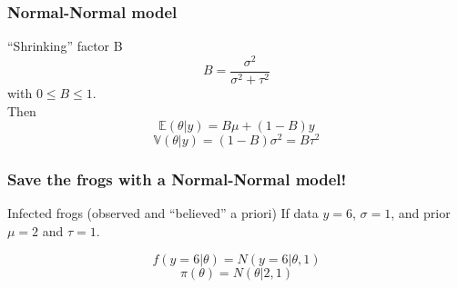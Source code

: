 \documentclass{beamer}
\newcommand{\E}{\mathbb{E}}
\newcommand{\V}{\mathbb{V}}
\newcommand{\1}{\ensuremath{\mathbf{1}}}
\begin{document}
\begin{frame}\frametitle{Normal-Normal model}
	\begin{block}{``Shrinking'' factor B}
		\begin{equation}
			B = \frac{\sigma^2}{\sigma^2 + \tau^2}
		\end{equation}
		with $0 \leq B \leq 1$.\\
		Then
		\begin{equation}
			\E(\theta|y) = B \mu + (1-B) y
		\end{equation}
		\begin{equation}
			\V(\theta|y) = (1-B)\sigma^2 = B \tau^2
		\end{equation}
	\end{block}
\end{frame}
%
%
%
\begin{frame}\frametitle{Save the frogs with a Normal-Normal model!}
	\begin{block}{Infected frogs (observed and ``believed'' a priori)}
		If data $y = 6$, $\sigma = 1$, and prior $\mu = 2$ and $\tau = 1$.
	\end{block}
	\vspace{-1ex}
	\begin{equation}
		f(y = 6|\theta) = N(y=6|\theta,1)
	\end{equation}
	\begin{equation}
		\pi(\theta) = N(\theta|2, 1)
	\end{equation}
\end{frame}
\end{document}
